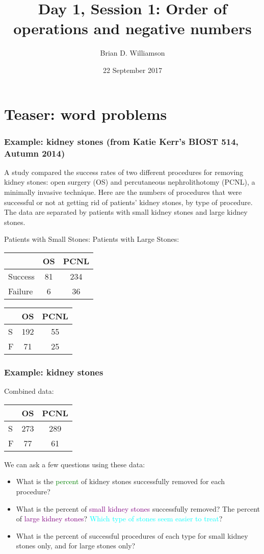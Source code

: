\documentclass[11pt]{beamer}
\title{Day 1, Session 1: Order of operations and negative numbers}
\author{Brian D. Williamson}
\institute{EPI/BIOST Bootcamp 2017}
\date{22 September 2017}
\newcommand{\myframe}[1]{\begin{frame} \frametitle{#1}}
\newenvironment{spaceitemize}
{ \begin{itemize}
    \setlength{\itemsep}{10pt}
    \setlength{\parskip}{0pt}
    \setlength{\parsep}{0pt}     }
{ \end{itemize}                  }
\begin{document}
\begin{frame}
\titlepage
\end{frame}

\section{Teaser: word problems}
\myframe{Example: kidney stones \small(from Katie Kerr's BIOST 514, Autumn 2014)}
A study compared the success rates of two different procedures for removing kidney stones:  open surgery (OS) and percutaneous nephrolithotomy (PCNL), a minimally invasive technique.  Here are the numbers of procedures that were successful or not at getting rid of patients' kidney stones, by type of procedure.  The data are separated by patients with small kidney stones and large kidney stones.

{\scriptsize
\centering
Patients with Small Stones: \hspace{0.5cm} Patients with Large Stones: 

\hspace{1.3cm}
\begin{tabular}{lcc}
 & OS & PCNL \\
 \hline
 Success & 81 & 234 \\
 Failure & 6 & 36 \\
 \hline
\end{tabular}
\hspace{1cm}
\begin{tabular}{lcc}
 & OS & PCNL \\
 \hline
 S & 192 & 55 \\
 F & 71 & 25 \\
 \hline
\end{tabular}
}

\end{frame}

\myframe{Example: kidney stones}
Combined data:
\begin{tabular}{lcc}
 & OS & PCNL \\
 \hline
 S & 273 & 289 \\
 F & 77 & 61 \\
 \hline
\end{tabular}

We can ask a few questions using these data:
\begin{spaceitemize}
\item What is the \textcolor{green}{percent} of kidney stones successfully removed for each procedure?
\item What is the percent of \textcolor{purple}{small kidney stones} successfully removed? The percent of \textcolor{purple}{large kidney stones}? \textcolor{cyan}{Which type of stones seem easier to treat}?
\item What is the percent of successful procedures of each type for small kidney stones only, and for large stones only?
\end{spaceitemize}
\end{frame}
\end{document}
